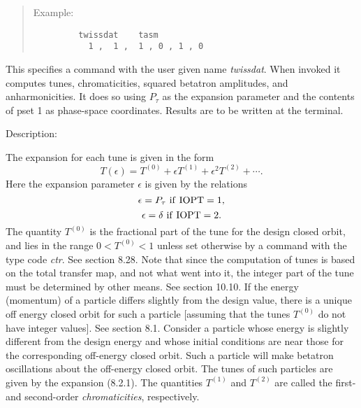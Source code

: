 \begin{quotation}
\vspace{5mm}
\noindent     Example:
\begin{verbatim}
         twissdat    tasm
           1 ,  1 ,  1 , 0 , 1 , 0
\end{verbatim}
\end{quotation}
This specifies a command with the user given name {\em twissdat}. When invoked it computes tunes, chromaticities, squared betatron amplitudes, and anharmonicities.  It does so using $P_{\tau}$ as the expansion parameter and the contents of pset 1 as phase-space coordinates.  Results are to be written at the terminal.

\vspace{5mm}
     Description:
\vspace{2mm}

     The expansion for each tune is given in the form 
\begin{equation}
T(\epsilon ) = T^{(0)} + \epsilon T^{(1)} + \epsilon^2
T^{(2)} + \cdots.
\end{equation}
Here the expansion parameter $\epsilon$ is given by the relations
\begin{equation}
\epsilon = P_{\tau} \ {\rm if \ IOPT} = 1,
\end{equation}
\begin{equation}
\epsilon = \delta \ {\rm if \ IOPT} = 2.
\end{equation}
The quantity $T^{(0)}$ is the fractional part of the tune for the design closed orbit, and lies in the range $0 < T^{(0)} < 1$ unless set otherwise by a command with the type code {\em ctr}.  See section 8.28.  Note that since the computation of tunes is based on the total transfer map, and
not what went into it, the integer part of the tune must be determined by other means.  See section 10.10.  If the energy (momentum) of a particle differs slightly from the design value, there is a unique off energy closed orbit for such a particle [assuming that the tunes $T^{(0)}$ do not have integer values].  See section 8.1.  Consider a particle whose energy is slightly different
from the design energy and whose initial conditions are near those for the corresponding off-energy closed orbit.  Such a particle will make betatron oscillations about the off-energy closed orbit.  The tunes of such particles are given by the expansion (8.2.1).  The quantities $T^{(1)}$ and $T^{(2)}$ are called the first- and second-order {\em chromaticities}, respectively.  

